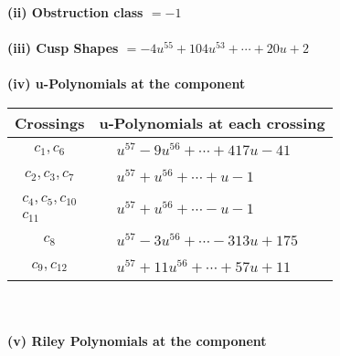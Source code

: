 \documentclass[1p]{elsarticle_modified}
\theoremstyle{definition}
\begin{document}
\flushleft \textbf{(ii) Obstruction class $= -1$}\\~\\
\flushleft \textbf{(iii) Cusp Shapes $= -4 u^{55}+104 u^{53}+\cdots+20 u+2$}\\~\\
\newpage\renewcommand{\arraystretch}{1}
\flushleft \textbf{(iv) u-Polynomials at the component}\newline \\
\begin{tabular}{m{50pt}|m{274pt}}
Crossings & \hspace{64pt}u-Polynomials at each crossing \\
\hline $$\begin{aligned}c_{1},c_{6}\end{aligned}$$&$\begin{aligned}
&u^{57}-9 u^{56}+\cdots+417 u-41
\end{aligned}$\\
\hline $$\begin{aligned}c_{2},c_{3},c_{7}\end{aligned}$$&$\begin{aligned}
&u^{57}+u^{56}+\cdots+u-1
\end{aligned}$\\
\hline $$\begin{aligned}c_{4},c_{5},c_{10}\\c_{11}\end{aligned}$$&$\begin{aligned}
&u^{57}+u^{56}+\cdots- u-1
\end{aligned}$\\
\hline $$\begin{aligned}c_{8}\end{aligned}$$&$\begin{aligned}
&u^{57}-3 u^{56}+\cdots-313 u+175
\end{aligned}$\\
\hline $$\begin{aligned}c_{9},c_{12}\end{aligned}$$&$\begin{aligned}
&u^{57}+11 u^{56}+\cdots+57 u+11
\end{aligned}$\\
\hline
\end{tabular}\\~\\
\newpage\renewcommand{\arraystretch}{1}
\flushleft \textbf{(v) Riley Polynomials at the component}\newline \\
\end{document}

